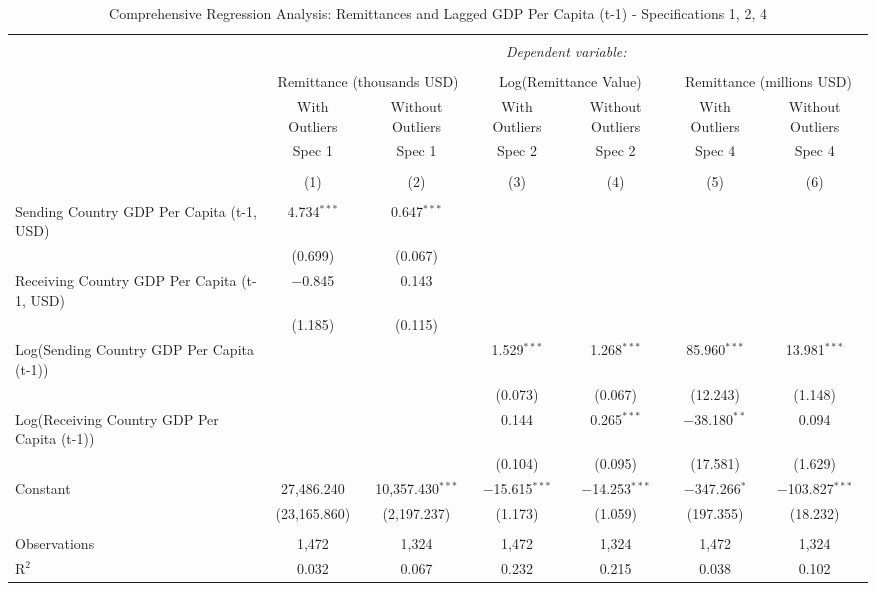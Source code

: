 
\begin{table}[!htbp] \centering
  \caption{Comprehensive Regression Analysis: Remittances and Lagged GDP Per Capita (t-1) - Specifications 1, 2, 4}
  \label{}
\begin{tabular}{@{\extracolsep{5pt}}lcccccc}
\\[-1.8ex]\hline
\hline \\[-1.8ex]
 & \multicolumn{6}{c}{\textit{Dependent variable:}} \\
\cline{2-7}
\\[-1.8ex] & \multicolumn{2}{c}{Remittance (thousands USD)} & \multicolumn{2}{c}{Log(Remittance Value)} & \multicolumn{2}{c}{Remittance (millions USD)} \\
 & With Outliers & Without Outliers & With Outliers & Without Outliers & With Outliers & Without Outliers \\
 & Spec 1 & Spec 1 & Spec 2 & Spec 2 & Spec 4 & Spec 4 \\
\\[-1.8ex] & (1) & (2) & (3) & (4) & (5) & (6)\\
\hline \\[-1.8ex]
 Sending Country GDP Per Capita (t-1, USD) & 4.734$^{***}$ & 0.647$^{***}$ & & & & \\
  & (0.699) & (0.067) & & & & \\
 Receiving Country GDP Per Capita (t-1, USD) & $-$0.845 & 0.143 & & & & \\
  & (1.185) & (0.115) & & & & \\
 Log(Sending Country GDP Per Capita (t-1)) & & & 1.529$^{***}$ & 1.268$^{***}$ & 85.960$^{***}$ & 13.981$^{***}$ \\
  & & & (0.073) & (0.067) & (12.243) & (1.148) \\
 Log(Receiving Country GDP Per Capita (t-1)) & & & 0.144 & 0.265$^{***}$ & $-$38.180$^{**}$ & 0.094 \\
  & & & (0.104) & (0.095) & (17.581) & (1.629) \\
 Constant & 27,486.240 & 10,357.430$^{***}$ & $-$15.615$^{***}$ & $-$14.253$^{***}$ & $-$347.266$^{*}$ & $-$103.827$^{***}$ \\
  & (23,165.860) & (2,197.237) & (1.173) & (1.059) & (197.355) & (18.232) \\
 \hline \\[-1.8ex]
Observations & 1,472 & 1,324 & 1,472 & 1,324 & 1,472 & 1,324 \\
R$^{2}$ & 0.032 & 0.067 & 0.232 & 0.215 & 0.038 & 0.102 \\

\end{tabular}
\end{table}
